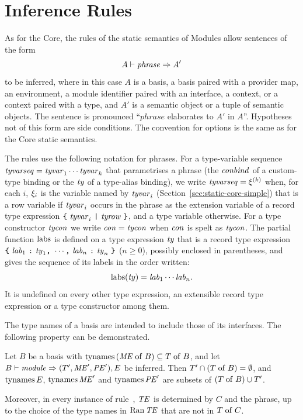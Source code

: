 \section{Inference Rules}\label{sec:static-modules-rules}

As for the Core, the rules of the static semantics of Modules allow sentences
of the form
\[
  A \vdash \mathit{phrase} \Rightarrow A'
\]
to be inferred, where in this case $A$ is a basis, a basis paired with a
provider map, an environment, a module identifier paired with an interface, a
context, or a context paired with a type, and $A'$ is a semantic object or a
tuple of semantic objects. The sentence is pronounced ``$\mathit{phrase}$
elaborates to $A'$ in $A$''. Hypotheses not of this form are side conditions.
The convention for options is the same as for the Core static semantics.

The rules use the following notation for phrases. For a type-variable sequence
$\mathit{tyvarseq} = \mathit{tyvar}_1 \cdots \mathit{tyvar}_k$ that parametrises a phrase (the
$\mathit{conbind}$ of a custom-type binding or the $\mathit{ty}$ of a type-alias binding), we
write $\mathit{tyvarseq} = \xi^{(k)}$ when, for each $i$, $\xi_i$ is the
variable named by $\mathit{tyvar}_i$ (Section~\ref{sec:static-core-simple}) that is a
row variable if $\mathit{tyvar}_i$ occurs in the phrase as the extension variable of a
record type expression $\kw{\kwlb}\ \tyvar_i\ \kw{|}\ \tyrow\ \kw{\kwrb}$, and a
type variable otherwise. For a type constructor $\mathit{tycon}$ we write $\mathit{con} =
\mathit{tycon}$ when $\mathit{con}$ is spelt as $\mathit{tycon}$. The partial function $\mathrm{labs}$ is
defined on a type expression $\mathit{ty}$ that is a record type expression
$\kw{\kwlb}\ \lab_1\ \kw{:}\ \ty_1\kw{,}\ \cdots\kw{,}\ \lab_n\ \kw{:}\
\ty_n\ \kw{\kwrb}$ ($n \geq 0$), possibly enclosed in parentheses, and gives
the sequence of its labels in the order written:
\[
  \mathrm{labs}(\mathit{ty}) = \mathit{lab}_1 \cdots \mathit{lab}_n .
\]
It is undefined on every other type expression, an extensible record type
expression or a type constructor among them.

The type names of a basis are intended to include those of its interfaces.
The following property can be demonstrated.

\begin{property}
Let $B$ be a basis with $\mathrm{tynames}\,(\mathit{ME} \mathrel{\mathrm{of}} B) \subseteq T \mathrel{\mathrm{of}} B$, and let
$B \vdash \mathit{module} \Rightarrow (T', \mathit{ME}', \mathit{PE}'), E$ be inferred. Then $T' \cap (T \mathrel{\mathrm{of}} B) =
\emptyset$, and $\mathrm{tynames}\, E$, $\mathrm{tynames}\, \mathit{ME}'$ and $\mathrm{tynames}\, \mathit{PE}'$ are subsets
of $(T \mathrel{\mathrm{of}} B) \cup T'$.

Moreover, in every instance of rule~, $\mathit{TE}$ is
determined by $C$ and the phrase, up to the choice of the type names in
$\mathrm{Ran}\,\mathit{TE}$ that are not in $T \mathrel{\mathrm{of}} C$.
\end{property}

